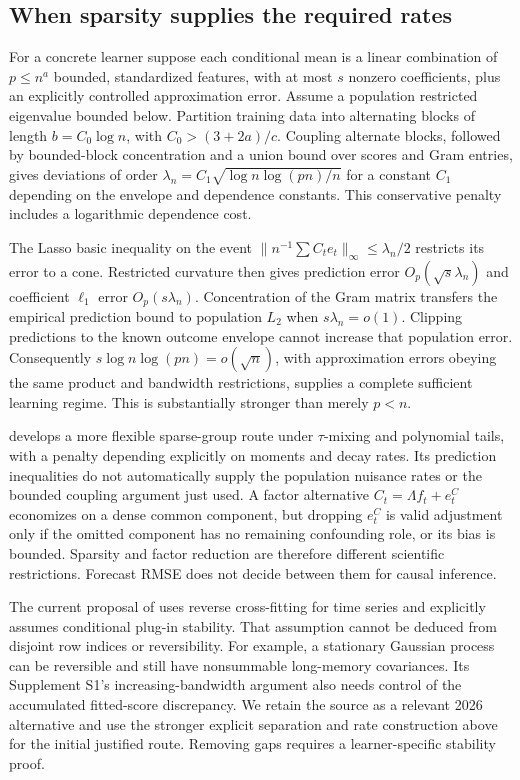 \subsection{When sparsity supplies the required rates}
For a concrete learner suppose each conditional mean is a linear combination
of $p\le n^a$ bounded, standardized features, with at most $s$ nonzero
coefficients, plus an explicitly controlled approximation error. Assume
a population restricted eigenvalue bounded below. Partition training data
into alternating blocks of length $b=C_0\log n$, with
$C_0>(3+2a)/c$. Coupling alternate blocks, followed by bounded-block
concentration and a union bound over scores and Gram entries, gives
deviations of order $\lambda_n=C_1\sqrt{\log n\log(pn)/n}$ for a
constant $C_1$ depending on the envelope and dependence constants.
This conservative penalty includes a logarithmic dependence cost.

The Lasso basic inequality on the event
$\|n^{-1}\sum C_te_t\|_\infty\le\lambda_n/2$ restricts its error
to a cone. Restricted curvature then gives prediction error
$O_p(\sqrt{s}\lambda_n)$ and coefficient $\ell_1$ error
$O_p(s\lambda_n)$. Concentration of the Gram matrix transfers the
empirical prediction bound to population $L_2$ when $s\lambda_n=o(1)$.
Clipping predictions to the known outcome envelope cannot increase that
population error. Consequently
$s\log n\log(pn)=o(\sqrt n)$, with approximation errors obeying the
same product and bandwidth restrictions, supplies a complete sufficient
learning regime. This is substantially stronger than merely $p<n$.

\citet[Assumptions 3.1--3.4 and Theorem 3.1]{babii2020} develops a more
flexible sparse-group route under $\tau$-mixing and polynomial tails,
with a penalty depending explicitly on moments and decay rates. Its
prediction inequalities do not automatically supply the population nuisance
rates or the bounded coupling argument just used. A factor alternative
$C_t=\Lambda f_t+e_t^C$ economizes on a dense common component, but
dropping $e_t^C$ is valid adjustment only if the omitted component has no
remaining confounding role, or its bias is bounded. Sparsity and factor
reduction are therefore different scientific restrictions. Forecast RMSE
does not decide between them for causal inference.

The current proposal of \citet[Assumptions 2.1--2.5]{ciganovic2026}
uses reverse cross-fitting for time series and explicitly assumes
conditional plug-in stability. That assumption cannot be deduced from
disjoint row indices or reversibility. For example, a stationary Gaussian
process can be reversible and still have nonsummable long-memory
covariances. Its Supplement S1's increasing-bandwidth argument also needs
control of the accumulated fitted-score discrepancy. We retain the source
as a relevant 2026 alternative and use the stronger explicit separation
and rate construction above for the initial justified route. Removing
gaps requires a learner-specific stability proof.

